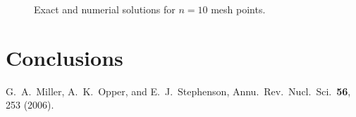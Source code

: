 \documentclass[10pt,showpacs,preprintnumbers,footinbib,amsmath,amssymb,aps,prl,twocolumn,groupedaddress,superscriptaddress,showkeys]{revtex4-1}
\begin{document}
	
\begin{figure}[hbtp]

\caption{Exact and numerial solutions for $n=10$ mesh points.} 
\label{fig:n10points}
\end{figure}

\section{Conclusions}

\begin{thebibliography}{99}
 G.~A.~Miller, A.~K.~Opper, and E.~J.~Stephenson, Annu.~Rev.~Nucl.~Sci.~{\bf 56}, 253 (2006).
\end{thebibliography}
\end{document}
